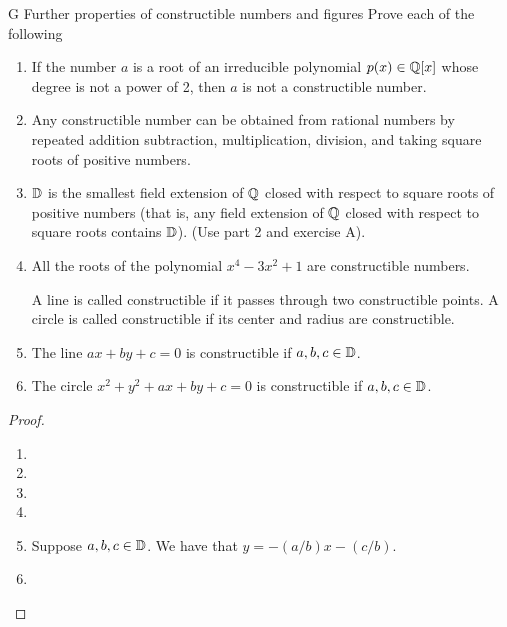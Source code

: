 \begin{exercise}{G Further properties of constructible numbers and figures}
Prove each of the following
\begin{enumerate}
    \item If the number $a$ is a root of an irreducible polynomial $p(x)\in\mathbb{Q}[x]$ whose degree is not a power of 2, then $a$ is not a constructible number.  
    \item Any constructible number can be obtained from rational numbers by repeated addition subtraction, multiplication, division, and taking square roots of positive numbers.
    \item $\mathbb{D}$ is the smallest field extension of $\mathbb{Q}$ closed with respect to square roots of positive numbers (that is, any field extension of $\mathbb{Q}$ closed with respect to square roots contains $\mathbb{D}$). (Use part 2 and exercise A).
    \item All the roots of the polynomial $x^4-3x^2+1$ are constructible numbers.

    A line is called constructible if it passes through two constructible points. A circle is called constructible if its center and radius are constructible.
    \item The line $ax+by+c=0$ is constructible if $a,b,c\in\mathbb{D}$.
    \item The circle $x^2+y^2+ax+by+c=0$ is constructible if $a,b,c\in\mathbb{D}$.
\end{enumerate}
\end{exercise}
\begin{proof}
 \begin{enumerate}
     \item 
     \item 
    \item
    \item 
    \item Suppose $a,b,c\in\mathbb{D}$. We have that $y=-(a/b)x-(c/b)$.
    \item
 \end{enumerate}
\end{proof}